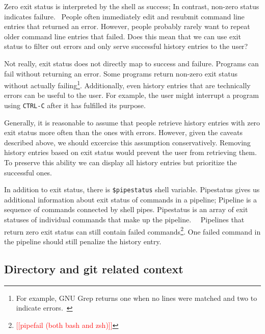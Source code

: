 \documentclass[thesis=M,english]{FITthesis}[2012/10/20]
\newcommand{\redtext}[1]{\textcolor{red}{[[#1]]}}
\let\myCite\cite
\renewcommand\cite{\unskip~\myCite}
\begin{document}
Zero exit status is interpreted by the shell as success; In contrast, non-zero status indicates failure.\cite{bashman} People often immediately edit and resubmit command line entries that returned an error. However, people probably rarely want to repeat older command line entries that failed. Does this mean that we can use exit status to filter out errors and only serve successful history entries to the user?

Not really, exit status does not directly map to success and failure. Programs can fail without returning an error. Some programs return non-zero exit status without actually failing\footnote{For example, GNU Grep returns one when no lines were matched and two to indicate errors.\cite{man-grep}}. 
Additionally, even history entries that are technically errors can be useful to the user. For example, the user might interrupt a program using \verb|CTRL-C| after it has fulfilled its purpose.

Generally, it is reasonable to assume that people retrieve history entries with zero exit status more often than the ones with errors. However, given the caveats described above, we should excercise this assumption conservatively. Removing history entries based on exit status would prevent the user from retrieving them. To preserve this ability we can display all history entries but prioritize the successful ones.


In addition to exit status, there is \verb|$pipestatus| shell variable. Pipestatus gives us additional information about exit status of commands in a pipeline; Pipeline is a sequence of commands connected by shell pipes. Pipestatus is an array of exit statuses of individual commands that make up the pipeline.\cite{bashman}\cite{zshdocs} Pipelines that return zero exit status can still contain failed commands\footnote{\redtext{pipefail (both bash and zsh)}}. One failed command in the pipeline should still penalize the history entry.
 


\subsection{Directory and git related context}
\end{document}
